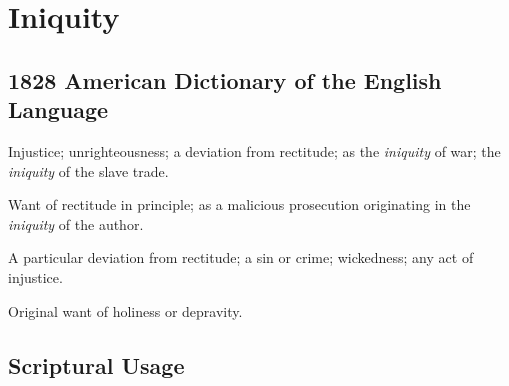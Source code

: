 \section{Iniquity}
	\label{INIQUITY}
	

\subsection{1828 American Dictionary of the English Language} %
	\label{INIQUITY-1828}

	\begin{compactitem}
		\item[1] Injustice; unrighteousness; a deviation from rectitude; as the \textit{iniquity} of war; the \textit{iniquity} of the slave trade.
		\item[2] Want of rectitude in principle; as a malicious prosecution originating in the \textit{iniquity} of the author.
		\item[3] A particular deviation from rectitude; a sin or crime; wickedness; any act of injustice.
		\item[4] Original want of holiness or depravity.
	\end{compactitem}



\subsection{Scriptural Usage} %
	\label{INIQUITY-SCRIPTURES}

	
